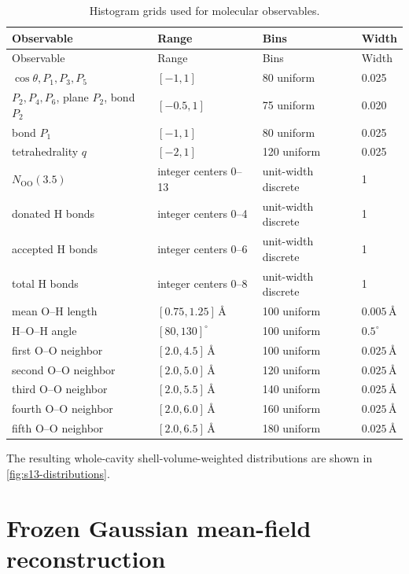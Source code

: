 \documentclass[11pt]{article}
\newcommand{\angstrom}{\text{\AA}}
\newcommand{\OO}{\mathrm{OO}}
\begin{document}
\begin{longtable}{p{}p{}p{}p{}}
\caption{Histogram grids used for molecular observables.}
\label{tab:histograms}\\
\toprule
Observable & Range & Bins & Width \\
\midrule
\endfirsthead
\toprule
Observable & Range & Bins & Width \\
\midrule
\endhead
\(\cos\theta,P_1,P_3,P_5\) & \([-1,1]\) & 80 uniform & 0.025 \\
\(P_2,P_4,P_6\), plane \(P_2\), bond \(P_2\) & \([-0.5,1]\) & 75 uniform & 0.020 \\
bond \(P_1\) & \([-1,1]\) & 80 uniform & 0.025 \\
tetrahedrality \(q\) & \([-2,1]\) & 120 uniform & 0.025 \\
\(N_{\OO}(3.5)\) & integer centers 0--13 & unit-width discrete & 1 \\
donated H bonds & integer centers 0--4 & unit-width discrete & 1 \\
accepted H bonds & integer centers 0--6 & unit-width discrete & 1 \\
total H bonds & integer centers 0--8 & unit-width discrete & 1 \\
mean O--H length & \([0.75,1.25]\,\angstrom\) & 100 uniform & \(0.005\,\angstrom\) \\
H--O--H angle & \([80,130]^\circ\) & 100 uniform & \(0.5^\circ\) \\
first O--O neighbor & \([2.0,4.5]\,\angstrom\) & 100 uniform & \(0.025\,\angstrom\) \\
second O--O neighbor & \([2.0,5.0]\,\angstrom\) & 120 uniform & \(0.025\,\angstrom\) \\
third O--O neighbor & \([2.0,5.5]\,\angstrom\) & 140 uniform & \(0.025\,\angstrom\) \\
fourth O--O neighbor & \([2.0,6.0]\,\angstrom\) & 160 uniform & \(0.025\,\angstrom\) \\
fifth O--O neighbor & \([2.0,6.5]\,\angstrom\) & 180 uniform & \(0.025\,\angstrom\) \\
\bottomrule
\end{longtable}

The resulting whole-cavity shell-volume-weighted distributions are shown in
\cref{fig:s13-distributions}.

\section{Frozen Gaussian mean-field reconstruction}
\end{document}
